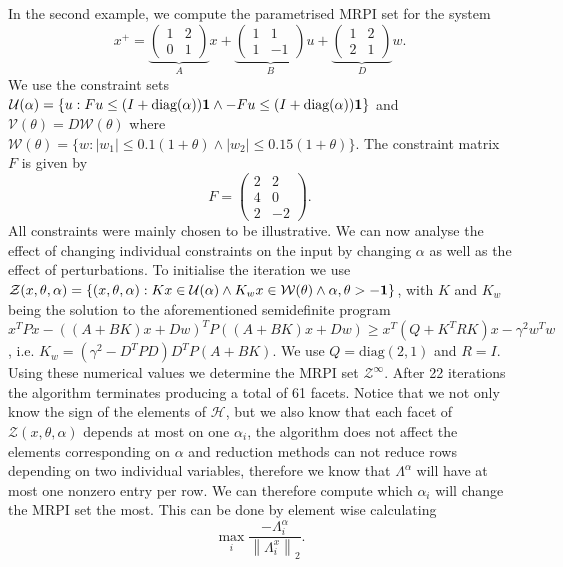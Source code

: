 \documentclass[letterpaper, 10pt, conference]{ieeeconf} %
\providecommand{\norm}[1]{\left\|#1\right\|}
\providecommand{\abs}[1]{\left|#1\right|}
\begin{document}
In the second example, we compute the parametrised MRPI set for the system
%
$$
x^+ = \underbrace{\left(\begin{array}{cc}1 & 2 \\ 0 & 1\end{array}\right)}_Ax + 
\underbrace{\left(\begin{array}{cc} 1 & 1 \\ 1 & -1\end{array}\right)}_B u + 
\underbrace{\left(\begin{array}{cc} 1 & 2 \\ 2 & 1 \end{array}\right)}_D w.
$$
%
We use the constraint sets $\mathcal U(\alpha) = \{u: Fu\leq(I+\text{diag}(\alpha)){\bf{1}} \wedge
-Fu\leq (I+\text{diag}(\alpha)){\bf{1}}\}$ and $\mathcal V(\theta) = D\mathcal W(\theta)$ where $\mathcal W(\theta) = \{w:
\abs{w_1}\leq 0.1(1+\theta)\wedge \abs{w_2}\leq 0.15(1+\theta)\}$. The constraint matrix $F$ is given by
%
$$
	F = \left(\begin{array}{cc} 2 & 2 \\ 4 & 0 \\ 2 & -2 \end{array}\right).
$$
%
All constraints were mainly chosen to be illustrative.
We can now analyse the effect of changing individual constraints on the input by changing $\alpha$ as well as the
effect of perturbations. To initialise the iteration we use
$\mathcal Z(x,\theta,\alpha) = \left\{(x,\theta,\alpha): Kx\in\mathcal U(\alpha)\wedge K_w x\in\mathcal W
(\theta)\wedge \alpha,\theta>-{\bf{1}}\right\}$, with $K$ and $K_w$ being the solution to the aforementioned semidefinite program
$x^TPx - ((A+BK)x+Dw)^TP((A+BK)x+Dw)\geq x^T(Q+K^TRK)x -\gamma^2 w^Tw$, i.e. $K_w = (\gamma^2-D^TPD)D^TP(A+BK)$.
We use $Q = \text{diag}(2,1)$ and $R = I$. Using these numerical values we determine the MRPI set 
$\mathcal Z^\infty$. After 22 iterations the algorithm terminates producing a total of 61 facets. 
Notice that we not only know the sign of the elements of $\mathcal H$, but we also know that each facet of $\mathcal Z(x,\theta,\alpha)$
depends at most on one $\alpha_i$, the algorithm does not affect the elements corresponding on $\alpha$ and reduction
methods can not reduce rows depending on two individual variables, therefore we know that $\Lambda^\alpha$ will have at 
most one nonzero entry per row. We can therefore 
compute which $\alpha_i$ will change the MRPI set the most. This can be done by element wise calculating
$$
	\max_i  \frac{-\Lambda_i^\alpha}{\norm{\Lambda_i^x}_2}.
$$
\end{document}
